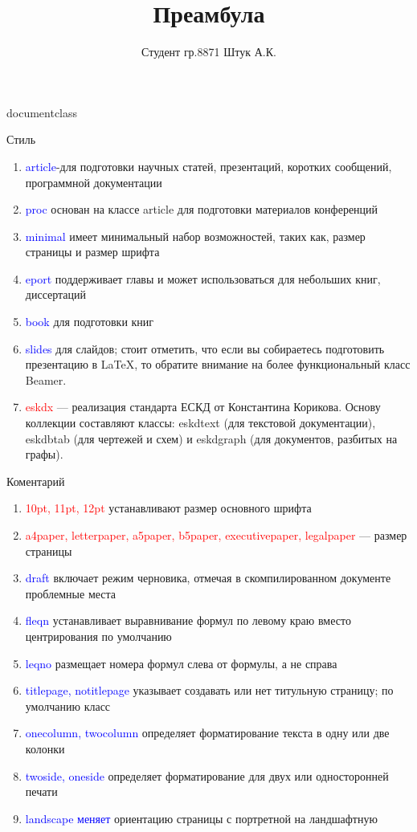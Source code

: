 \documentclass[10pt]{article}
\title{Преамбула}
\author{Студент гр.8871 Штук А.К.}
\begin{document}
\maketitle
\begin{center}
    \LARGE{documentclass}
\end{center}
\begin{center}
    {Стиль}
\end{center}
\begin{enumerate}
\item \textcolor{blue}{article}-для подготовки научных статей, презентаций, коротких сообщений, программной документации
\item \textcolor{blue}{proc} основан на классе article для подготовки материалов конференций
\item \textcolor{blue}{minimal} имеет минимальный набор возможностей, таких как, размер страницы и размер шрифта 
\item \textcolor{blue}{eport} поддерживает главы и может использоваться для небольших книг, диссертаций
\item \textcolor{blue}{book} для подготовки книг
\item \textcolor{blue}{slides} для слайдов; стоит отметить, что если вы собираетесь подготовить презентацию в LaTeX, то обратите внимание на более функциональный класс Beamer.
\item \textcolor{red}{eskdx} — реализация стандарта ЕСКД от Константина Корикова. Основу коллекции составляют классы: eskdtext (для текстовой документации), eskdbtab (для чертежей и схем) и eskdgraph (для документов, разбитых на графы). 
\end{enumerate}
\begin{center}
   {Коментарий}
\end{center}
\begin{enumerate}
\item \textcolor{red}{10pt, 11pt, 12pt} устанавливают размер основного шрифта
\item \textcolor{red}{a4paper, letterpaper, a5paper, b5paper, executivepaper, legalpaper} — размер страницы 
\item \textcolor{blue}{draft} включает режим черновика, отмечая в скомпилированном документе проблемные места 
\item \textcolor{blue}{fleqn} устанавливает выравнивание формул по левому краю вместо центрирования по умолчанию 
\item \textcolor{blue}{leqno} размещает номера формул слева от формулы, а не справа
\item \textcolor{blue}{titlepage, notitlepage} указывает создавать или нет титульную страницу; по умолчанию класс 
\item \textcolor{blue}{onecolumn, twocolumn} определяет форматирование текста в одну или две колонки
\item \textcolor{blue}{twoside, oneside} определяет форматирование для двух или односторонней печати 
\item \textcolor{blue}{landscape меняет} ориентацию страницы с портретной на ландшафтную
\end{enumerate}
\end{document}
